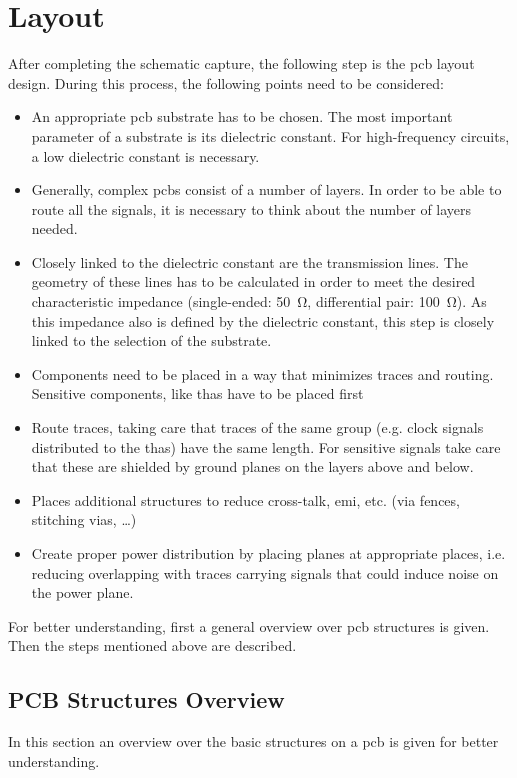 \section{Layout}
After completing the schematic capture, the following step is the \gls{pcb} layout design.
During this process, the following points need to be considered:
\begin{itemize}
	\item An appropriate \gls{pcb} substrate has to be chosen. The most important parameter of a substrate is its dielectric constant. For high-frequency circuits, a low dielectric constant is necessary.
	\item Generally, complex \glspl{pcb} consist of a number of layers. In order to be able to route all the signals, it is necessary to think about the number of layers needed. 
	\item Closely linked to the dielectric constant are the transmission lines. The geometry of these lines has to be calculated in order to meet the desired characteristic impedance (single-ended: \SI{50}{\ohm}, differential pair: \SI{100}{\ohm}). As this impedance also is defined by the dielectric constant, this step is closely linked to the selection of the substrate.
	\item Components need to be placed in a way that minimizes traces and routing. Sensitive components, like \glspl{tha} have to be placed first 
	\item Route traces, taking care that traces of the same group (e.g. clock signals distributed to the \glspl{tha}) have the same length. For sensitive signals take care that these are shielded by ground planes on the layers above and below.
	\item Places additional structures to reduce cross-talk, \gls{emi}, etc. (via fences, stitching vias, \dots)
	\item Create proper power distribution by placing planes at appropriate places, i.e. reducing overlapping with traces carrying signals that could induce noise on the power plane.
\end{itemize}

For better understanding, first a general overview over \gls{pcb} structures is given. 
Then the steps mentioned above are described.
\subsection*{PCB Structures Overview} \label{ssec:pcb_structs}
In this section an overview over the basic structures on a \gls{pcb} is given for better understanding.

